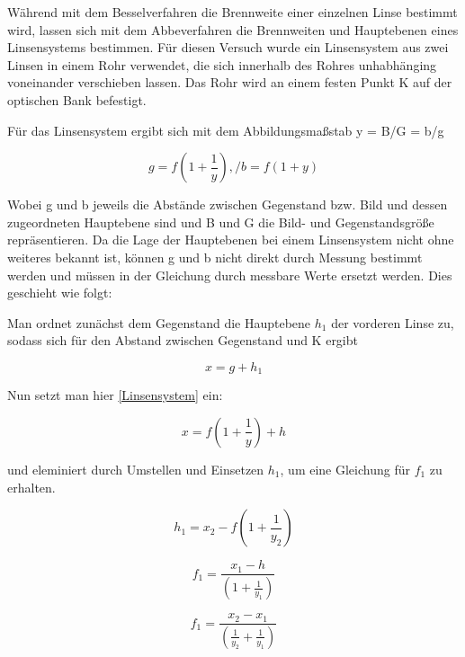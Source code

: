 Während mit dem Besselverfahren die Brennweite einer einzelnen Linse bestimmt wird, lassen sich mit dem Abbeverfahren die Brennweiten und Hauptebenen eines Linsensystems bestimmen.
Für diesen Versuch wurde ein Linsensystem aus zwei Linsen in einem Rohr verwendet, die sich innerhalb des Rohres unhabhänging voneinander verschieben lassen.
Das Rohr wird an einem festen Punkt K auf der optischen Bank befestigt.

Für das Linsensystem ergibt sich mit dem Abbildungsmaßstab y = B/G = b/g

\begin{equation} \label{Linsensystem}
    g = f(1 + \frac{1}{y}),/ b = f(1+y)
\end{equation}

Wobei g und b jeweils die Abstände zwischen Gegenstand bzw. Bild und dessen zugeordneten Hauptebene sind und B und G die Bild- und Gegenstandsgröße repräsentieren.
Da die Lage der Hauptebenen bei einem Linsensystem nicht ohne weiteres bekannt ist, können g und b nicht direkt durch Messung bestimmt werden und müssen in der Gleichung
durch messbare Werte ersetzt werden.
Dies geschieht wie folgt:

Man ordnet zunächst dem Gegenstand die Hauptebene $h_1$ der vorderen Linse zu, sodass sich für den Abstand zwischen Gegenstand und K ergibt

\begin{equation} \label{x1}
    x = g + h_1
\end{equation}

Nun setzt man hier \ref{Linsensystem} ein:

\begin{equation} \label{x2}
    x = f(1 + \frac{1}{y}) + h
\end{equation}

und eleminiert durch Umstellen und Einsetzen $h_1$, um eine Gleichung für $f_1$ zu erhalten.

\begin{equation} \label{1}
    h_1 = x_2 - f(1 + \frac{1}{y_2})
\end{equation}

\begin{equation} \label{3}
    f_1 = \frac{x_1 - h}{(1 + \frac{1}{y_1})}
\end{equation}

\begin{equation} \label{4}
    f_1 = \frac{x_2 - x_1}{(\frac{1}{y_2} + \frac{1}{y_1})}
\end{equation}

